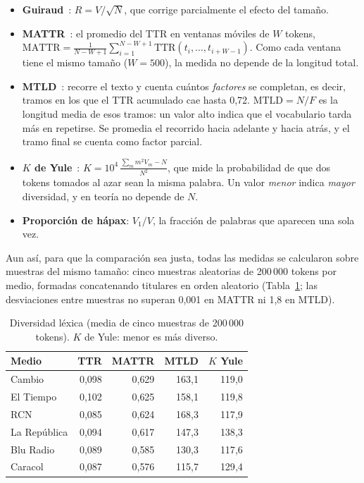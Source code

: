 \documentclass[10pt,twocolumn]{article}
\begin{document}
\begin{itemize}
\item \textbf{Guiraud}~\cite{guiraud1954}: $R=V/\sqrt{N}$, que corrige parcialmente
el efecto del tamaño.
\item \textbf{MATTR}~\cite{covington2010}: el promedio del TTR en ventanas
móviles de $W$ tokens, $\mathrm{MATTR}=\frac{1}{N-W+1}\sum_{i=1}^{N-W+1}
\mathrm{TTR}(t_i,\ldots,t_{i+W-1})$. Como cada ventana tiene el mismo tamaño
($W=500$), la medida no depende de la longitud total.
\item \textbf{MTLD}~\cite{mccarthy2010}: recorre el texto y cuenta cuántos
\emph{factores} se completan, es decir, tramos en los que el TTR acumulado
cae hasta 0,72. $\mathrm{MTLD}=N/F$ es la longitud media de esos tramos: un
valor alto indica que el vocabulario tarda más en repetirse. Se promedia el
recorrido hacia adelante y hacia atrás, y el tramo final se cuenta como
factor parcial.
\item \textbf{$K$ de Yule}~\cite{yule1944}: $K=10^4\,\frac{\sum_m m^2V_m-N}{N^2}$,
que mide la probabilidad de que dos tokens tomados al azar sean la misma
palabra. Un valor \emph{menor} indica \emph{mayor} diversidad, y en teoría no
depende de $N$.
\item \textbf{Proporción de hápax}: $V_1/V$, la fracción de palabras que
aparecen una sola vez.
\end{itemize}

Aun así, para que la comparación sea justa, todas las medidas se calcularon
sobre muestras del mismo tamaño: cinco muestras aleatorias de 200\,000 tokens
por medio, formadas concatenando titulares en orden aleatorio
(Tabla~\ref{tab:div}; las desviaciones entre muestras no superan 0,001 en
MATTR ni 1,8 en MTLD).

\begin{table}[t]
\centering\small
\caption{Diversidad léxica (media de cinco muestras de 200\,000 tokens).
$K$ de Yule: menor es más diverso.}
\label{tab:div}
\begin{tabular}{lrrrr}
\toprule
Medio & TTR & MATTR & MTLD & $K$ Yule\\
\midrule
Cambio       & 0{,}098 & 0{,}629 & 163{,}1 & 119{,}0\\
El Tiempo    & 0{,}102 & 0{,}625 & 158{,}1 & 119{,}8\\
RCN          & 0{,}085 & 0{,}624 & 168{,}3 & 117{,}9\\
La República & 0{,}094 & 0{,}617 & 147{,}3 & 138{,}3\\
Blu Radio    & 0{,}089 & 0{,}585 & 130{,}3 & 117{,}6\\
Caracol      & 0{,}087 & 0{,}576 & 115{,}7 & 129{,}4\\
\bottomrule
\end{tabular}
\end{table}
\end{document}
